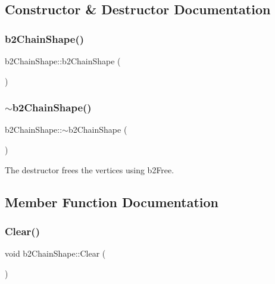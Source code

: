\subsection{Constructor \& Destructor Documentation}
\mbox{\label{classb2_chain_shape_ac4fafbfed6f5894c9f8173d2a09a1fe7}} 
\subsubsection{\texorpdfstring{b2ChainShape()}{b2ChainShape()}}
{\footnotesize\ttfamily b2\+Chain\+Shape\+::b2\+Chain\+Shape (\begin{DoxyParamCaption}{ }\end{DoxyParamCaption})\hspace{0.3cm}{\ttfamily [inline]}}

\mbox{\label{classb2_chain_shape_a8c032394f5a85e7fc425a437e7689a18}} 
\subsubsection{\texorpdfstring{$\sim$b2ChainShape()}{~b2ChainShape()}}
{\footnotesize\ttfamily b2\+Chain\+Shape\+::$\sim$b2\+Chain\+Shape (\begin{DoxyParamCaption}{ }\end{DoxyParamCaption})}



The destructor frees the vertices using b2\+Free. 



\subsection{Member Function Documentation}
\mbox{\label{classb2_chain_shape_a434d4b61ab15726302ec5ad484011c33}} 
\subsubsection{\texorpdfstring{Clear()}{Clear()}}
{\footnotesize\ttfamily void b2\+Chain\+Shape\+::\+Clear (\begin{DoxyParamCaption}{ }\end{DoxyParamCaption})}



